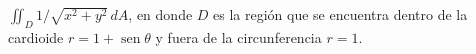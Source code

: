 \item $\iint_D 1/\sqrt{x^2 + y^2} \, dA$, en donde $D$ es la región que se encuentra dentro de la cardioide $r = 1 + \operatorname{sen} \theta$ y fuera de la circunferencia $r = 1$.
